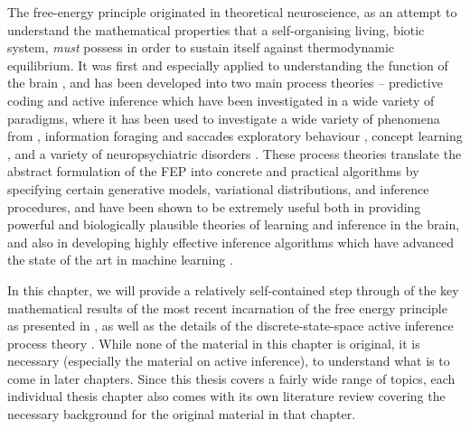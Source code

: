 The free-energy principle originated in theoretical neuroscience, as an attempt to understand the mathematical properties that a self-organising living, biotic system, \emph{must} possess in order to sustain itself against thermodynamic equilibrium. It was first and especially applied to understanding the function of the brain \citep{friston2006free,friston2010action,friston2012history}, and has been developed into two main process theories -- predictive coding \citep{rao1999predictive,friston2003learning,friston2005theory,friston2008hierarchical} and active inference \citep{friston2009reinforcement,friston2012active,friston2015active,friston2017process,friston2018deep,da2020active} which have been investigated in a wide variety of paradigms, where it has been used to investigate a wide variety of phenomena from \citep{friston2014anatomy,friston2015knowing,friston2015active}, information foraging and saccades \citep{parr2017uncertainty,parr2018active,parr2019computational} exploratory behaviour \citep{schwartenbeck2013exploration,friston2015active,friston2017curiosity,friston2020sophisticated}, concept learning \citep{schwartenbeck_computational_2019}, and a variety of neuropsychiatric disorders \citep{lawson2014aberrant,adams2012smooth,mirza2019impulsivity,cullen2018active}. These process theories translate the abstract formulation of the FEP into concrete and practical algorithms by specifying certain generative models, variational distributions, and inference procedures, and have been shown to be extremely useful both in providing powerful and biologically plausible theories of learning and inference in the brain, and also in developing highly effective inference algorithms which have advanced the state of the art in machine learning \citep{parr2019neuronal,millidge_deep_2019,tschantz2020reinforcement,millidge2020relationship}. 

In this chapter, we will provide a relatively self-contained step through of the key mathematical results of the most recent incarnation of the free energy principle as presented in \citep{friston2019particularphysics, parr2020markov}, as well as the details of the discrete-state-space active inference process theory \citep{friston2015active,da2020active}. While none of the material in this chapter is original, it is necessary (especially the material on active inference), to understand what is to come in later chapters. Since this thesis covers a fairly wide range of topics, each individual thesis chapter also comes with its own literature review covering the necessary background for the original material in that chapter.

